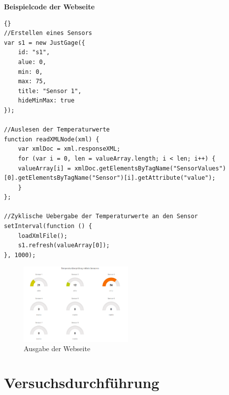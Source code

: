 \textbf{Beispielcode der Webseite}

\begin{lstlisting}{}
//Erstellen eines Sensors
var s1 = new JustGage({
	id: "s1",
	alue: 0,
    min: 0,
    max: 75,
    title: "Sensor 1",
    hideMinMax: true
});

//Auslesen der Temperaturwerte
function readXMLNode(xml) {
	var xmlDoc = xml.responseXML;
	for (var i = 0, len = valueArray.length; i < len; i++) {
	valueArray[i] = xmlDoc.getElementsByTagName("SensorValues")[0].getElementsByTagName("Sensor")[i].getAttribute("value");
	}
};

//Zyklische Uebergabe der Temperaturwerte an den Sensor
setInterval(function () {
	loadXmlFile();
	s1.refresh(valueArray[0]);
}, 1000);
\end{lstlisting}

\begin{figure}[H]%
\centering
\includegraphics[width=0.5\textwidth]{Images/Webseite.png}
\caption{Ausgabe der Webseite}
\label{fig:webpage}
\end{figure}

\section{Versuchsdurchführung}